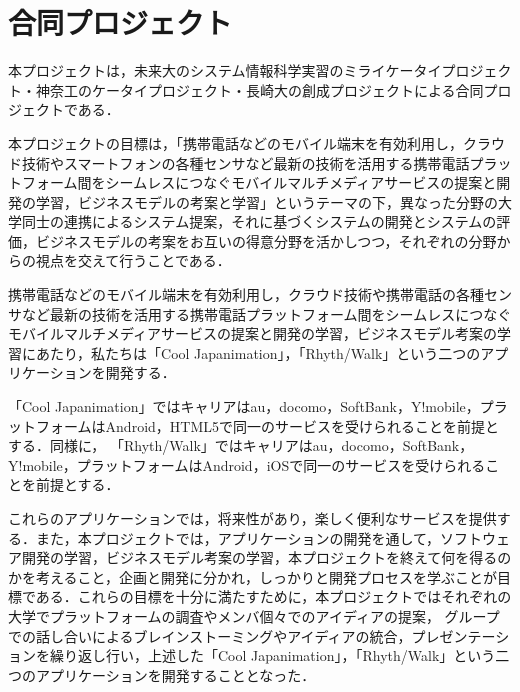 \section{合同プロジェクト}
本プロジェクトは，未来大のシステム情報科学実習のミライケータイプロジェクト・神奈工のケータイプロジェクト・長崎大の創成プロジェクトによる合同プロジェクトである．
\par
本プロジェクトの目標は，「携帯電話などのモバイル端末を有効利用し，クラウド技術やスマートフォンの各種センサなど最新の技術を活用する携帯電話プラットフォーム間をシームレスにつなぐモバイルマルチメディアサービスの提案と開発の学習，ビジネスモデルの考案と学習」というテーマの下，異なった分野の大学同士の連携によるシステム提案，それに基づくシステムの開発とシステムの評価，ビジネスモデルの考案をお互いの得意分野を活かしつつ，それぞれの分野からの視点を交えて行うことである．
\par
携帯電話などのモバイル端末を有効利用し，クラウド技術や携帯電話の各種センサなど最新の技術を活用する携帯電話プラットフォーム間をシームレスにつなぐモバイルマルチメディアサービスの提案と開発の学習，ビジネスモデル考案の学習にあたり，私たちは「Cool Japanimation」，「Rhyth/Walk」という二つのアプリケーションを開発する．
\par
「Cool Japanimation」ではキャリアはau，docomo，SoftBank，Y!mobile，プラットフォームはAndroid，HTML5で同一のサービスを受けられることを前提とする．同様に，
「Rhyth/Walk」ではキャリアはau，docomo，SoftBank，Y!mobile，プラットフォームはAndroid，iOSで同一のサービスを受けられることを前提とする．
\par
これらのアプリケーションでは，将来性があり，楽しく便利なサービスを提供する．また，本プロジェクトでは，アプリケーションの開発を通して，ソフトウェア開発の学習，ビジネスモデル考案の学習，本プロジェクトを終えて何を得るのかを考えること，企画と開発に分かれ，しっかりと開発プロセスを学ぶことが目標である．これらの目標を十分に満たすために，本プロジェクトではそれぞれの大学でプラットフォームの調査やメンバ個々でのアイディアの提案， グループでの話し合いによるブレインストーミングやアイディアの統合，プレゼンテーションを繰り返し行い，上述した「Cool Japanimation」，「Rhyth/Walk」という二つのアプリケーションを開発することとなった．
